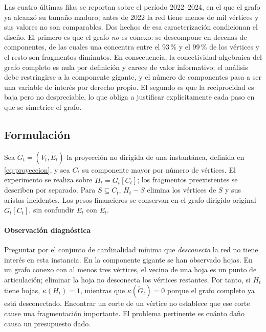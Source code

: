 \documentclass[journal]{IEEEtran}
\begin{document}
Las cuatro últimas filas se reportan sobre el período 2022--2024, en el que el
grafo ya alcanzó su tamaño maduro; antes de 2022 la red tiene menos de mil
vértices y sus valores no son comparables. Dos hechos de esa caracterización
condicionan el diseño. El primero es que el grafo \emph{no} es conexo: se
descompone en decenas de componentes, de las cuales una concentra entre el
93\,\% y el 99\,\% de los vértices y el resto son fragmentos diminutos. En consecuencia, la conectividad
algebraica del grafo completo es nula por definición y carece de valor
informativo; el análisis debe restringirse a la componente gigante, y el número de
componentes pasa a ser una variable de interés por derecho propio. El segundo es
que la reciprocidad es baja pero no despreciable, lo que obliga a justificar
explícitamente cada paso en que se simetrice el grafo.

\subsection{Formulación}

Sea $\tilde G_t=(V_t,\tilde E_t)$ la proyección no dirigida de una instantánea,
definida en \eqref{eq:proyeccion}, y sea $C_t$ su componente mayor por número de
vértices. El experimento se realiza sobre $H_t=\tilde G_t[C_t]$; los fragmentos
preexistentes se describen por separado. Para $S\subseteq C_t$, $H_t-S$ elimina
los vértices de $S$ y sus aristas incidentes. Los pesos financieros se conservan
en el grafo dirigido original $G_t[C_t]$, sin confundir $E_t$ con $\tilde E_t$.

\paragraph{Observación diagnóstica} Preguntar por el conjunto de cardinalidad
mínima que \emph{desconecta} la red no tiene interés en esta instancia. En la
componente gigante se han observado hojas. En un grafo conexo con al menos tres
vértices, el vecino de una hoja es un punto de articulación; eliminar la hoja
no desconecta los vértices restantes. Por tanto, si $H_t$ tiene hojas,
$\kappa(H_t)=1$, mientras que $\kappa(\tilde G_t)=0$ porque el grafo completo
ya está desconectado. Encontrar un corte de un vértice no establece que ese
corte cause una fragmentación importante. El problema pertinente es cuánto daño
causa un presupuesto dado.
\end{document}
